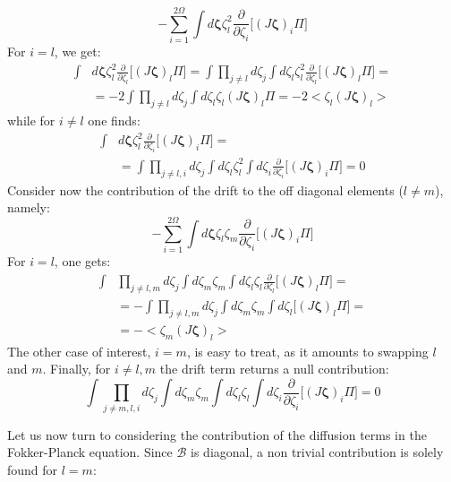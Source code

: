 \documentclass[showpacs,prl,superscriptaddress,nofootinbib, twocolumn]{revtex4}
\begin{document}
\[
-\sum_{i=1}^{2\Omega} \int d{\boldsymbol \zeta} \zeta_l^2 \frac{\partial}{\partial\zeta_i}\big[ (J{\boldsymbol \zeta})_i\Pi \big]
\]   
For $i=l$, we get:
 \[
 \begin{split}
 \int &d{\boldsymbol \zeta} \zeta_l^2 \frac{\partial}{\partial\zeta_l}\big[ (J{\boldsymbol \zeta})_l\Pi \big]=\int \prod_{j \neq l} d\zeta_j \int d\zeta_l \zeta_l^2 \frac{\partial}{\partial\zeta_l}\big[ (J{\boldsymbol \zeta})_l\Pi \big]=\\
 &=-2\int \prod_{j \neq l} d\zeta_j \int d\zeta_l \zeta_l (J{\boldsymbol \zeta})_l \Pi=-2<\zeta_l(J{\boldsymbol \zeta})_l>
\end{split} 
 \]
while for $i\neq l$ one finds:
 \[
 \begin{split}
 \int &d{\boldsymbol \zeta} \zeta_l^2 \frac{\partial}{\partial\zeta_i}\big[ (J{\boldsymbol \zeta})_i\Pi \big] = \\
 &=\int \prod_{j \neq l,i} d\zeta_j \int d\zeta_l \zeta_l^2\int d\zeta_i \frac{\partial}{\partial\zeta_i}\big[ (J{\boldsymbol \zeta})_i\Pi \big]=0
\end{split} 
 \]
 Consider now the contribution of the drift  to the off diagonal elements ($l\neq m$), namely:
 \[
 -\sum_{i=1}^{2\Omega} \int d{\boldsymbol \zeta} \zeta_l \zeta_m \frac{\partial}{\partial\zeta_i}\big[ (J{\boldsymbol \zeta})_i\Pi \big]
 \]
 For $i=l$, one gets:
 \[
 \begin{split}
 \int & \prod_{j \neq l,m} d\zeta_j \int d\zeta_m \zeta_m \int d\zeta_l  \zeta_l \frac{\partial}{\partial\zeta_l}\big[ (J{\boldsymbol \zeta})_l\Pi \big]=\\
 &=- \int \prod_{j \neq l,m} d\zeta_j \int d\zeta_m \zeta_m \int d\zeta_l \big[ (J{\boldsymbol \zeta})_l\Pi \big]=\\
& =-<\zeta_m (J{\boldsymbol \zeta})_l>
\end{split} 
 \]
 The other case of interest, $i=m$, is easy to treat, as it amounts to swapping $l$ and $m$. Finally, for $i\neq l,m$ the drift term returns a null contribution:
 \[
 \int \prod_{j \neq m,l,i} d\zeta_j \int d\zeta_m \zeta_m \int d\zeta_l  \zeta_l \int d \zeta_i \frac{\partial}{\partial\zeta_i}\big[ (J{\boldsymbol \zeta})_i\Pi \big]=0
 \]

 Let us now turn to considering the contribution of the diffusion terms in the Fokker-Planck equation. Since ${\boldsymbol {\mathcal B}}$ is diagonal,  a non trivial contribution is solely found for $l=m$:
 
\end{document}
